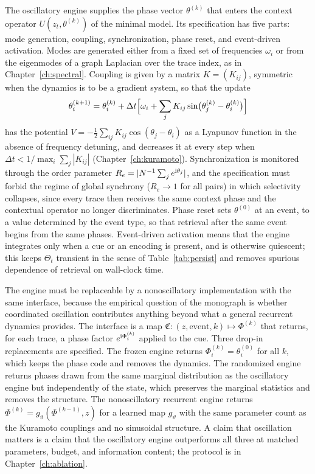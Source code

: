 The oscillatory engine supplies the phase vector $\theta^{(k)}$ that enters the context operator $U(z_t,\theta^{(k)})$ of the minimal model. Its specification has five parts: mode generation, coupling, synchronization, phase reset, and event-driven activation. Modes are generated either from a fixed set of frequencies $\omega_i$ or from the eigenmodes of a graph Laplacian over the trace index, as in Chapter~\ref{ch:spectral}. Coupling is given by a matrix $K=(K_{ij})$, symmetric when the dynamics is to be a gradient system, so that the update
\begin{equation}\label{eq:kuraupdate}
\theta_i^{(k+1)}=\theta_i^{(k)}+\Delta t\Bigl[\omega_i+\sum_jK_{ij}\sin\bigl(\theta_j^{(k)}-\theta_i^{(k)}\bigr)\Bigr]
\end{equation}
has the potential $V=-\tfrac12\sum_{ij}K_{ij}\cos(\theta_j-\theta_i)$ as a Lyapunov function in the absence of frequency detuning, and decreases it at every step when $\Delta t<1/\max_i\sum_j|K_{ij}|$ (Chapter~\ref{ch:kuramoto}). Synchronization is monitored through the order parameter $R_e=|N^{-1}\sum_je^{\mathrm{i}\theta_j}|$, and the specification must forbid the regime of global synchrony ($R_e\to1$ for all pairs) in which selectivity collapses, since every trace then receives the same context phase and the contextual operator no longer discriminates. Phase reset sets $\theta^{(0)}$ at an event, to a value determined by the event type, so that retrieval after the same event begins from the same phases. Event-driven activation means that the engine integrates only when a cue or an encoding is present, and is otherwise quiescent; this keeps $\Theta_t$ transient in the sense of Table~\ref{tab:persist} and removes spurious dependence of retrieval on wall-clock time.

The engine must be replaceable by a nonoscillatory implementation with the same interface, because the empirical question of the monograph is whether coordinated oscillation contributes anything beyond what a general recurrent dynamics provides. The interface is a map $\mathfrak C:(z,\text{event},k)\mapsto\Phi^{(k)}$ that returns, for each trace, a phase factor $e^{\mathrm{i}\Phi_i^{(k)}}$ applied to the cue. Three drop-in replacements are specified. The frozen engine returns $\Phi_i^{(k)}=\theta_i^{(0)}$ for all $k$, which keeps the phase code and removes the dynamics. The randomized engine returns phases drawn from the same marginal distribution as the oscillatory engine but independently of the state, which preserves the marginal statistics and removes the structure. The nonoscillatory recurrent engine returns $\Phi^{(k)}=g_\vartheta(\Phi^{(k-1)},z)$ for a learned map $g_\vartheta$ with the same parameter count as the Kuramoto couplings and no sinusoidal structure. A claim that oscillation matters is a claim that the oscillatory engine outperforms all three at matched parameters, budget, and information content; the protocol is in Chapter~\ref{ch:ablation}.

